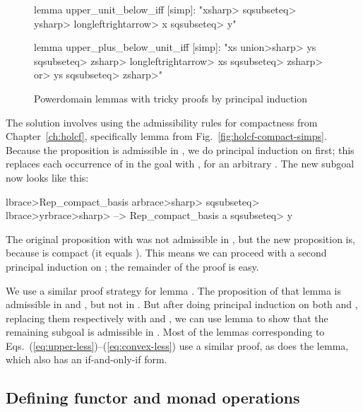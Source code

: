 \begin{figure}
\begin{isacode}
lemma upper_unit_below_iff [simp]:
  "{x}\<sharp> \<sqsubseteq> {y}\<sharp> \<longleftrightarrow> x \<sqsubseteq> y"
\end{isacode}
\unmedskip
{}
\begin{isacode}
lemma upper_plus_below_unit_iff [simp]:
  "xs \<union>\<sharp> ys \<sqsubseteq> {z}\<sharp> \<longleftrightarrow> xs \<sqsubseteq> {z}\<sharp> \<or> ys \<sqsubseteq> {z}\<sharp>"
\end{isacode}
\caption{Powerdomain lemmas with tricky proofs by principal induction}
\label{fig:pd-lemmas-tricky}
\end{figure}

The solution involves using the admissibility rules for compactness from Chapter~\ref{ch:holcf}, specifically lemma  from Fig.~\ref{fig:holcf-compact-simps}. Because the proposition is admissible in , we do principal induction on  first; this replaces each occurrence of  in the goal with , for an arbitrary . The new subgoal now looks like this:
%
\begin{isacode}
\<lbrace>Rep_compact_basis a\<rbrace>\<sharp> \<sqsubseteq> \<lbrace>y\<rbrace>\<sharp> --> Rep_compact_basis a \<sqsubseteq> y
\end{isacode}
%
The original proposition with  was not admissible in , but the new proposition is, because  is compact (it equals ). This means we can proceed with a second principal induction on ; the remainder of the proof is easy.

We use a similar proof strategy for lemma . The proposition of that lemma is admissible in  and , but not in . But after doing principal induction on both  and , replacing them respectively with  and , we can use lemma  to show that the remaining subgoal is admissible in . Most of the lemmas corresponding to Eqs.~(\ref{eq:upper-less})--(\ref{eq:convex-less}) use a similar proof, as does the  lemma, which also has an if-and-only-if form.

\subsection{Defining functor and monad operations}
\label{sec:pd-monad}

